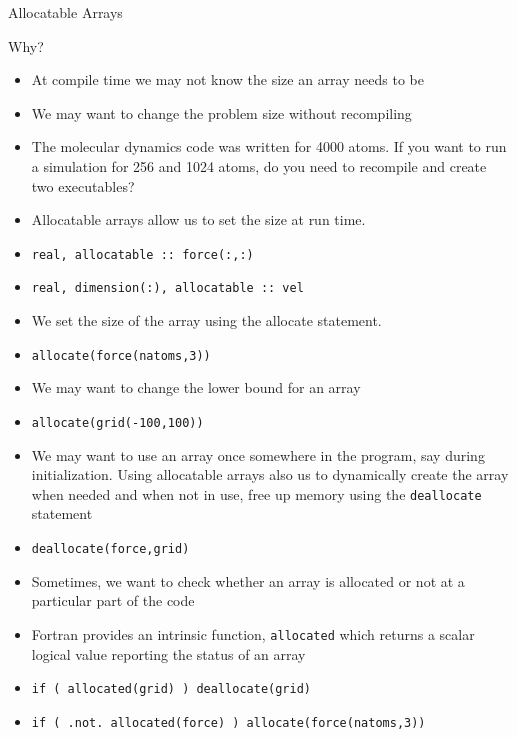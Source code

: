 \documentclass[c,mathserif,compress,xcolor=svgnames]{beamer}
\newcommand{\lstfortran}[1]{\lstinline[language={[90]Fortran},basicstyle=\footnotesize\ttfamily]|#1|}
\begin{document}
\begin{frame}{Allocatable Arrays}
  \begin{block}{\scriptsize Why?}
    \begin{itemize}
      \item At compile time we may not know the size an array needs to be
      \item We may want to change the problem size without recompiling
      \item The molecular dynamics code was written for 4000 atoms. If you want to run a simulation for 256 and 1024 atoms, do you need to recompile and create two executables?
    \end{itemize}
  \end{block}
  \begin{itemize}
    \item Allocatable arrays allow us to set the size at run time.
    \item[] \lstfortran{real, allocatable :: force(:,:)}
    \item[] \lstfortran{real, dimension(:), allocatable :: vel}
    \item We set the size of the array using the allocate statement.
    \item[] \lstfortran{allocate(force(natoms,3))}
    \item We may want to change the lower bound for an array
    \item[] \lstfortran{allocate(grid(-100,100))}
    \item We may want to use an array once somewhere in the program, say during initialization. Using allocatable arrays also us to dynamically create the array when needed and when not in use, free up memory using the \lstfortran{deallocate} statement
    \item[] \lstfortran{deallocate(force,grid)}
    \item Sometimes, we want to check whether an array is allocated or not at a particular part of the code
    \item Fortran provides an intrinsic function, \lstfortran{allocated} which returns a scalar logical value reporting the status of an array
    \item[] \lstfortran{if ( allocated(grid) ) deallocate(grid)}
    \item[] \lstfortran{if ( .not. allocated(force) ) allocate(force(natoms,3))}
  \end{itemize}
\end{frame}
\end{document}
